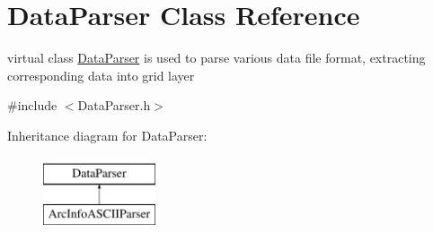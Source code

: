 \hypertarget{classDataParser}{\section{\-Data\-Parser \-Class \-Reference}
\label{classDataParser}
}


virtual class \hyperlink{classDataParser}{\-Data\-Parser} is used to parse various data file format, extracting corresponding data into grid layer  




{\ttfamily \#include $<$\-Data\-Parser.\-h$>$}

\-Inheritance diagram for \-Data\-Parser\-:\begin{figure}[H]
\begin{center}
\leavevmode
\includegraphics[height=2.000000cm]{classDataParser}
\end{center}
\end{figure}
